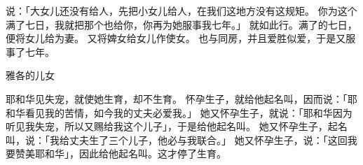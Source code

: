 {说：「大女儿还没有给人，先把小女儿给人，在我们这地方没有这规矩。
你为这个满了七日，我就把那个也给你，你再为她服事我七年。」
就如此行。满了{}的七日，{}便将女儿{}给{}为妻。
又将婢女{}给女儿{}作使女。
也与{}同房，并且爱{}胜似爱{}，于是又服事了{}七年。
\par }{\SH 雅各的儿女
\par }{\PP {}耶和华见{}失宠，就使她生育，{}却不生育。
怀孕生子，就给他起名叫{}，因而说：「耶和华看见我的苦情，如今我的丈夫必爱我。」
她又怀孕生子，就说：「耶和华因为听见我失宠，所以又赐给我这个儿子」，于是给他起名叫{}。
她又怀孕生子，起名叫{}，说：「我给丈夫生了三个儿子，他必与我联合。」
她又怀孕生子，说：「这回我要赞美耶和华」，因此给他起名叫{}。这才停了生育。

}
